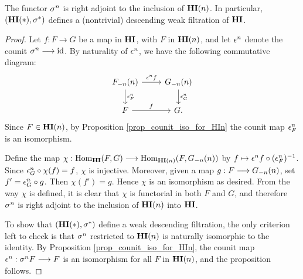 \begin{prop}\label{prop_HI_upper_slice}
The functor $\sgHI{n}$ is right adjoint to the 
inclusion of $\LHI[n]{\HI}$. In particular, $(\LHI[*]{\HI}, 
\sgHI{*})$ defines a (nontrivial) descending weak filtration of 
$\HI$.
\end{prop}
\begin{proof}
Let $f: F \to G$ be a map in $\HI$, with $F$ in $\LHI[n]{\HI}$,
and let $\cuHI^n$ denote the counit $\sgHI{n} \to \id$.
By naturality of $\cuHI^n$, we have the following commutative 
diagram:
\[
\begin{tikzcd}
\LHI[n]{\RHI[n]{F}} \arrow{r}{\cuHI^n f}\arrow{d}{\cuHI^n_F} 
& \LHI[n]{\RHI[n]{G}} \arrow{d}{\cuHI^n_G} \\
F \arrow{r}{f}
& G.
\end{tikzcd}
\]
Since $F \in \LHI[n]{\HI}$, by Proposition 
\ref{prop_counit_iso_for_HIn} the counit map $\cuHI^n_F$ is an 
isomorphism.

Define the map $\chi: \homHI(F, G) \to \hom_{\LHI[n]{\HI}}(F, 
\LHI[n]{\RHI[n]{G}})$ by $f \mapsto 
\cuHI^n f \comp (\cuHI^n_F)^{-1}$. Since $\cuHI^n_G \comp \chi(f) 
= f$, $\chi$ is injective.  Moreover, given a map $g: F 
\to \LHI[n]{\RHI[n]{G}}$, set $f' = \cuHI_G^n \comp g$. Then 
$\chi(f') = g$. Hence $\chi$ is an isomorphism as desired.
From the way $\chi$ is defined, it is clear that $\chi$ is 
functorial in both $F$ and $G$, and therefore $\sgHI{n}$ is
right adjoint to the inclusion of $\LHI[n]{\HI}$ into $\HI$.

To show that $(\LHI[*]{\HI}, \sgHI{*})$ define a weak descending
filtration, the only criterion left to check is that $\sgHI{n}$
restricted to $\LHI[n]{\HI}$ is naturally isomorphic to the
identity. By Proposition \ref{prop_counit_iso_for_HIn}, the
counit map $\cuHI^n: \sgHI{n} F \to F$ is an isomorphism for
all $F$ in $\LHI[n]{\HI}$, and the proposition follows.
\end{proof}

